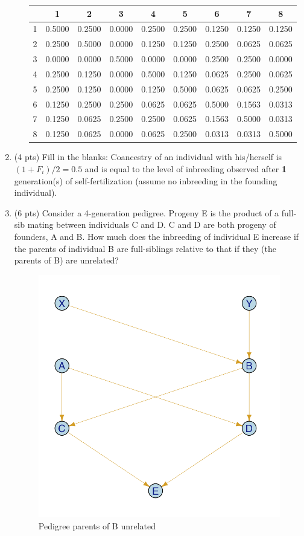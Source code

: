 \documentclass[a4paper, 11pt]{article}
\begin{document}
\begin{enumerate}
\begin{itemize}
\begin{tabular}{|c|c|c|c|c|c|c|c|c|}
\hline
	&	1	&	2	&	3	&	4	&	5	&	6	&	7	&	8 \\ \hline
1	&	0.5000	&	0.2500	&	0.0000	&	0.2500	&	0.2500	&	0.1250	&	0.1250	&	0.1250 \\ \hline
2	&	0.2500	&	0.5000	&	0.0000	&	0.1250	&	0.1250	&	0.2500	&	0.0625	&	0.0625 \\ \hline
3	&	0.0000	&	0.0000	&	0.5000	&	0.0000	&	0.0000	&	0.2500	&	0.2500	&	0.0000 \\ \hline
4	&	0.2500	&	0.1250	&	0.0000	&	0.5000	&	0.1250	&	0.0625	&	0.2500	&	0.0625 \\ \hline
5	&	0.2500	&	0.1250	&	0.0000	&	0.1250	&	0.5000	&	0.0625	&	0.0625	&	0.2500 \\ \hline
6	&	0.1250	&	0.2500	&	0.2500	&	0.0625	&	0.0625	&	0.5000	&	0.1563	&	0.0313 \\ \hline
7	&	0.1250	&	0.0625	&	0.2500	&	0.2500	&	0.0625	&	0.1563	&	0.5000	&	0.0313 \\ \hline
8	&	0.1250	&	0.0625	&	0.0000	&	0.0625	&	0.2500	&	0.0313	&	0.0313	&	0.5000 \\ \hline
\end{tabular}
\end{itemize}

\item (4 pts) Fill in the blanks: Coancestry of an individual with his/herself is \textbf{\((1+F_{i})/2 = 0.5\)} and is equal to the level of inbreeding observed after \textbf{1} generation(s) of self-fertilization (assume no inbreeding in the founding individual).

\item (6 pts) Consider a 4-generation pedigree. Progeny E is the product of a full-sib mating between individuals C and D. C and D are both progeny of founders, A and B. How much does the inbreeding of individual E increase if the parents of individual B are full-siblings relative to that if they (the parents of B) are unrelated?

\begin{figure}[!h]
    \centering
    \includegraphics[height=0.5\textwidth]{Homework4a.png}
    \caption{ Pedigree parents of B unrelated}
\end{figure}


\end{enumerate}
\end{document}
